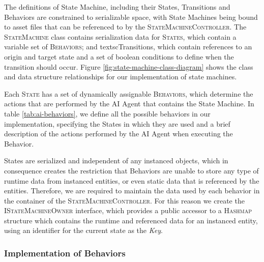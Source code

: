 The definitions of State Machine, including their States, Transitions and Behaviors are constrained to serializable space, with State Machines being bound to asset files that can be referenced to by the \textsc{StateMachineController}. The \textsc{StateMachine} class contains serialization data for \textsc{States}, which contain a variable set of \textsc{Behaviors}; and textsc{Transitions}, which contain references to an origin and target state and a set of boolean conditions to define when the transition should occur. Figure \ref{fig:state-machine-class-diagram} shows the class and data structure relationships for our implementation of state machines.



Each \textsc{State} has a set of dynamically assignable \textsc{Behaviors}, which determine the actions that are performed by the AI Agent that contains the State Machine. In table \ref{tab:ai-behaviors}, we define all the possible behaviors in our implementation, specifying the States in which they are used and a brief description of the actions performed by the AI Agent when executing the Behavior.



States are serialized and independent of any instanced objects, which in consequence creates the restriction that Behaviors are unable to store any type of runtime data from instanced entities, or even static data that is referenced by the entities. Therefore, we are required to maintain the data used by each behavior in the container of the \textsc{StateMachineController}. For this reason we create the \textsc{IStateMachineOwner} interface, which provides a public accessor to a \textsc{Hashmap} structure which contains the runtime and referenced data for an instanced entity, using an identifier for the current state as the \emph{Key}.

\subsubsection{Implementation of Behaviors}

